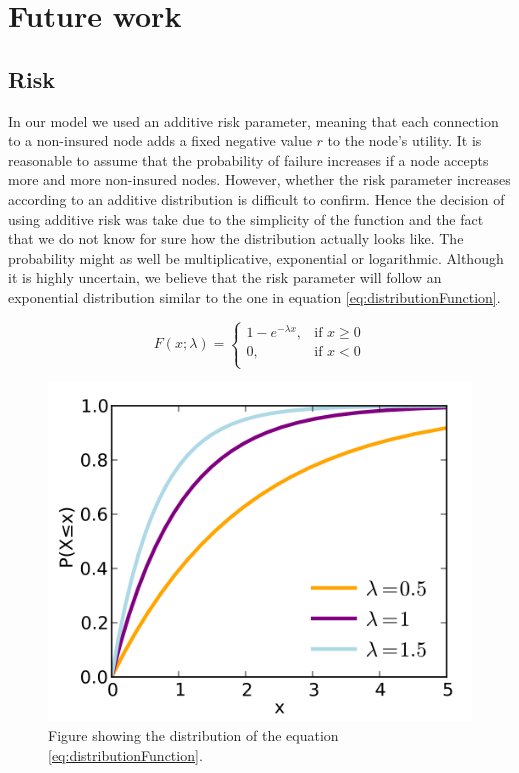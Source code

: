 \chapter{Future work}
\label{chp:futurework} 

\section{Risk}
In our model we used an additive risk parameter, meaning that each connection to a non-insured node adds a fixed negative value $r$ to the node's utility. It is reasonable to assume that the probability of failure increases if a node accepts more and more non-insured nodes. However, whether the risk parameter increases according to an additive distribution is difficult to confirm. Hence the decision of using additive risk was take due to the simplicity of the function and the fact that we do not know for sure how the distribution actually looks like. The probability might as well be multiplicative, exponential or logarithmic. Although it is highly uncertain, we believe that the risk parameter will follow an exponential distribution similar to the one in equation \ref{eq:distributionFunction}.

\begin{equation}
    F(x;\lambda)= 
\begin{cases}
    1-e^{-\lambda x} ,& \text{if } x \geq 0\\
   0,& \text{if }  x<0\\
    
    
\end{cases}
\label{eq:distributionFunction}
\end{equation}



\begin{figure}[h]
\centering
  \includegraphics[width=0.5\linewidth]{../Figures/exponentialFunction.png}
  \caption{\label{fig:exponentialFunction} Figure showing the distribution of the equation \ref{eq:distributionFunction}. }
\end{figure}

